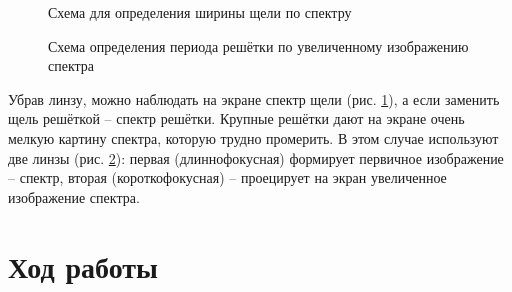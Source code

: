 \documentclass[a5paper,10pt, twoside]{article} %
\begin{document}
	\begin{figure}[h]
		\caption{Схема для определения ширины щели по спектру}
		\label{ris:spectrum}
	\end{figure}
	
	\begin{figure}[h]
		\caption{Схема определения периода решётки по увеличенному изображению спектра}
		\label{ris:d_per}
	\end{figure}
	
	Убрав линзу, можно наблюдать на экране спектр щели (рис. \ref{ris:spectrum}), а если заменить щель решёткой -- спектр решётки. Крупные решётки дают на экране очень мелкую картину спектра, которую трудно промерить. В этом случае используют две линзы (рис. \ref{ris:d_per}): первая (длиннофокусная) формирует первичное изображение -- спектр, вторая (короткофокусная) -- проецирует на экран увеличенное изображение спектра.

	


\section{Ход работы}
\end{document}
